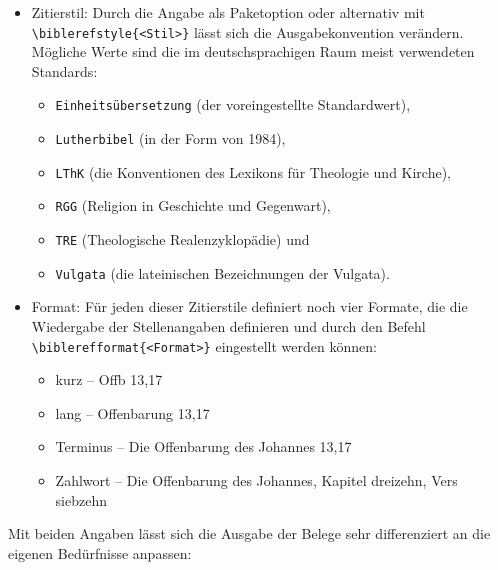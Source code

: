 \begin{itemize}
    \item Zitierstil:
    Durch die Angabe als Paketoption oder alternativ mit \lstinline/\biblerefstyle{<Stil>}/ lässt sich die Ausgabekonvention verändern.
    Mögliche Werte sind die im deutschsprachigen Raum meist verwendeten Standards: 
    \begin{itemize}
        \item \lstinline/Einheitsübersetzung/ (der voreingestellte Standardwert),
        \item \lstinline/Lutherbibel/ (in der Form von 1984),
        \item \lstinline/LThK/ (die Konventionen des Lexikons für Theologie und Kirche),
        \item \lstinline/RGG/ (Religion in Geschichte und Gegenwart),
        \item \lstinline/TRE/ (Theologische Realenzyklopädie) und 
        \item \lstinline/Vulgata/ (die lateinischen Bezeichnungen der Vulgata).
    \end{itemize}
    
    \item Format:
    Für jeden dieser Zitierstile definiert  noch vier Formate, die die Wiedergabe der
    Stellenangaben definieren und durch den Befehl \lstinline/\biblerefformat{<Format>}/ eingestellt
    werden können:
    
    \begin{itemize}
        \item kurz -- Offb 13,17
        \item lang -- Offenbarung 13,17
        \item Terminus -- Die Offenbarung des Johannes 13,17
        \item Zahlwort -- Die Offenbarung des Johannes, Kapitel dreizehn, Vers siebzehn
    \end{itemize}
    
\end{itemize}

Mit beiden Angaben lässt sich die Ausgabe der Belege sehr differenziert an die eigenen Bedürfnisse 
anpassen:

%

